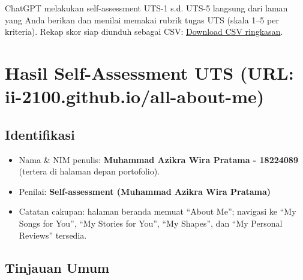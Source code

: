 \documentclass[
  letterpaper,
  DIV=11,
  numbers=noendperiod]{scrreprt}
\providecommand{\tightlist}{%
  \setlength{\itemsep}{0pt}\setlength{\parskip}{0pt}}
\begin{document}
ChatGPT melakukan self-assessment UTS-1 s.d. UTS-5 langsung dari laman
yang Anda berikan dan menilai memakai rubrik tugas UTS (skala 1--5 per
kriteria). Rekap skor siap diunduh sebagai CSV:
\href{sandbox:/mnt/data/UTS_self_assessment.csv}{Download CSV
ringkasan}.


\chapter{Hasil Self-Assessment UTS (URL:
ii-2100.github.io/all-about-me)}\label{hasil-self-assessment-uts-url-ii-2100.github.ioall-about-me}

\section{Identifikasi}\label{identifikasi}

\begin{itemize}
\tightlist
\item
  Nama \& NIM penulis: \textbf{Muhammad Azikra Wira Pratama - 18224089}
  (tertera di halaman depan portofolio).
\item
  Penilai: \textbf{Self-assessment (Muhammad Azikra Wira Pratama)}
\item
  Catatan cakupan: halaman beranda memuat ``About Me''; navigasi ke ``My
  Songs for You'', ``My Stories for You'', ``My Shapes'', dan ``My
  Personal Reviews'' tersedia.
\end{itemize}

\section{Tinjauan Umum}\label{tinjauan-umum}
\end{document}
